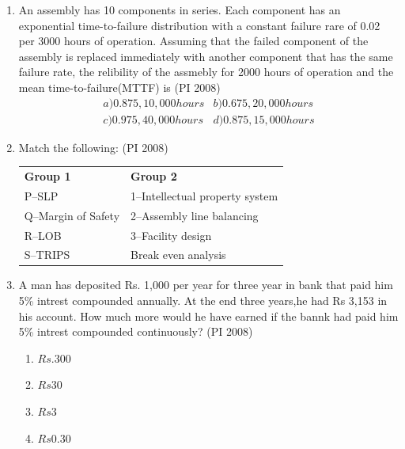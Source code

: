 \documentclass[journal,12pt,onecolumn]{IEEEtran}
\theoremstyle{remark}
\begin{document}
\begin{enumerate}
 \item %
 An assembly has 10 components in series. Each component has an exponential time-to-failure distribution with a constant failure rare of 0.02 per 3000 hours of operation. Assuming that the failed component of the assembly is replaced immediately with another component that has the same failure rate, the relibility of the assmebly for 2000 hours of operation and the mean time-to-failure(MTTF) is 
    \hfill{(PI 2008)}
    \[
    \begin{matrix}
        {a) 0.875,10,000 hours } & {b)0.675,20,000 hours}\\
        {c)0.975,40,000 hours}  & {d)0.875,15,000 hours}
    \end{matrix}
    \]
    \vspace{1cm}
    \item %
    Match the following: 
    \hfill{(PI 2008)}\\
    \vspace{1cm}
    \begin{tabular}{p{4cm} p{6cm}}
\textbf{Group 1} & \textbf{Group 2} \\
    P--SLP                  & 1--Intellectual property system \\
    Q--Margin of Safety     & 2--Assembly line balancing\\
    R--LOB                  & 3--Facility design\\
    S--TRIPS                & Break even analysis\\
    \end{tabular}
    \vspace{1cm}
     \item %
     A man has deposited Rs. 1,000 per year for three year in bank that paid him 5\% intrest compounded annually. At the end three years,he had Rs 3,153 in his account. How much more would he have earned if the bannk had paid him 5\% intrest compounded continuously?
    \hfill{(PI 2008)}
    \begin{multicols}{4}
    \begin{enumerate}
        \item $Rs.300$
        \item $Rs30$
        \item $Rs3$
        \item $Rs0.30$
    \end{enumerate}
\end{multicols}
\vspace{1cm}


\end{enumerate}
\end{document}
